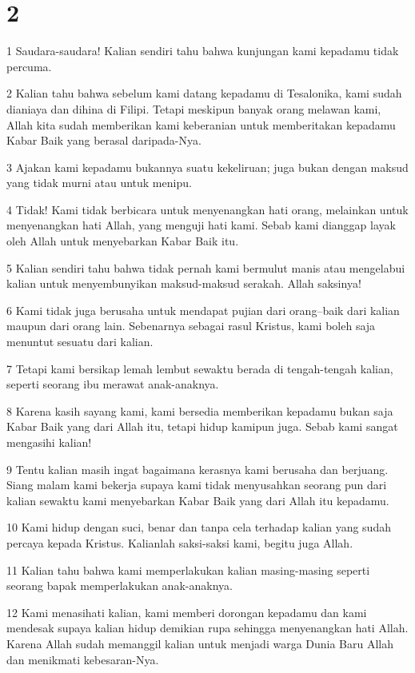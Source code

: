 \chapter{2}

\par 1 Saudara-saudara! Kalian sendiri tahu bahwa kunjungan kami kepadamu tidak percuma.
\par 2 Kalian tahu bahwa sebelum kami datang kepadamu di Tesalonika, kami sudah dianiaya dan dihina di Filipi. Tetapi meskipun banyak orang melawan kami, Allah kita sudah memberikan kami keberanian untuk memberitakan kepadamu Kabar Baik yang berasal daripada-Nya.
\par 3 Ajakan kami kepadamu bukannya suatu kekeliruan; juga bukan dengan maksud yang tidak murni atau untuk menipu.
\par 4 Tidak! Kami tidak berbicara untuk menyenangkan hati orang, melainkan untuk menyenangkan hati Allah, yang menguji hati kami. Sebab kami dianggap layak oleh Allah untuk menyebarkan Kabar Baik itu.
\par 5 Kalian sendiri tahu bahwa tidak pernah kami bermulut manis atau mengelabui kalian untuk menyembunyikan maksud-maksud serakah. Allah saksinya!
\par 6 Kami tidak juga berusaha untuk mendapat pujian dari orang--baik dari kalian maupun dari orang lain. Sebenarnya sebagai rasul Kristus, kami boleh saja menuntut sesuatu dari kalian.
\par 7 Tetapi kami bersikap lemah lembut sewaktu berada di tengah-tengah kalian, seperti seorang ibu merawat anak-anaknya.
\par 8 Karena kasih sayang kami, kami bersedia memberikan kepadamu bukan saja Kabar Baik yang dari Allah itu, tetapi hidup kamipun juga. Sebab kami sangat mengasihi kalian!
\par 9 Tentu kalian masih ingat bagaimana kerasnya kami berusaha dan berjuang. Siang malam kami bekerja supaya kami tidak menyusahkan seorang pun dari kalian sewaktu kami menyebarkan Kabar Baik yang dari Allah itu kepadamu.
\par 10 Kami hidup dengan suci, benar dan tanpa cela terhadap kalian yang sudah percaya kepada Kristus. Kalianlah saksi-saksi kami, begitu juga Allah.
\par 11 Kalian tahu bahwa kami memperlakukan kalian masing-masing seperti seorang bapak memperlakukan anak-anaknya.
\par 12 Kami menasihati kalian, kami memberi dorongan kepadamu dan kami mendesak supaya kalian hidup demikian rupa sehingga menyenangkan hati Allah. Karena Allah sudah memanggil kalian untuk menjadi warga Dunia Baru Allah dan menikmati kebesaran-Nya.
